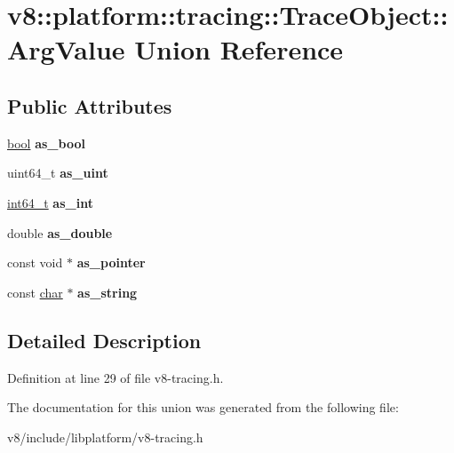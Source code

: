 \hypertarget{unionv8_1_1platform_1_1tracing_1_1TraceObject_1_1ArgValue}{}\section{v8\+:\+:platform\+:\+:tracing\+:\+:Trace\+Object\+:\+:Arg\+Value Union Reference}
\label{unionv8_1_1platform_1_1tracing_1_1TraceObject_1_1ArgValue}
\subsection*{Public Attributes}
\begin{DoxyCompactItemize}
\item 
\mbox{\label{unionv8_1_1platform_1_1tracing_1_1TraceObject_1_1ArgValue_a5321b94fe5473d33e2ab69945e16eee0}} 
\mbox{\hyperlink{classbool}{bool}} {\bfseries as\+\_\+bool}
\item 
\mbox{\label{unionv8_1_1platform_1_1tracing_1_1TraceObject_1_1ArgValue_a70a307359d9a88811e5cfe83f2abad69}} 
uint64\+\_\+t {\bfseries as\+\_\+uint}
\item 
\mbox{\label{unionv8_1_1platform_1_1tracing_1_1TraceObject_1_1ArgValue_a538fa5c735eaadf99bf13f088cbdaf58}} 
\mbox{\hyperlink{classint64__t}{int64\+\_\+t}} {\bfseries as\+\_\+int}
\item 
\mbox{\label{unionv8_1_1platform_1_1tracing_1_1TraceObject_1_1ArgValue_ad767bc3c8ca039dac75129239cdcc402}} 
double {\bfseries as\+\_\+double}
\item 
\mbox{\label{unionv8_1_1platform_1_1tracing_1_1TraceObject_1_1ArgValue_afe6b63c9eeef7d4b11a8b2665b0ad81f}} 
const void $\ast$ {\bfseries as\+\_\+pointer}
\item 
\mbox{\label{unionv8_1_1platform_1_1tracing_1_1TraceObject_1_1ArgValue_a2572f6aa4fd94641114e73f2e864b4ad}} 
const \mbox{\hyperlink{classchar}{char}} $\ast$ {\bfseries as\+\_\+string}
\end{DoxyCompactItemize}


\subsection{Detailed Description}


Definition at line 29 of file v8-\/tracing.\+h.



The documentation for this union was generated from the following file\+:\begin{DoxyCompactItemize}
\item 
v8/include/libplatform/v8-\/tracing.\+h\end{DoxyCompactItemize}
